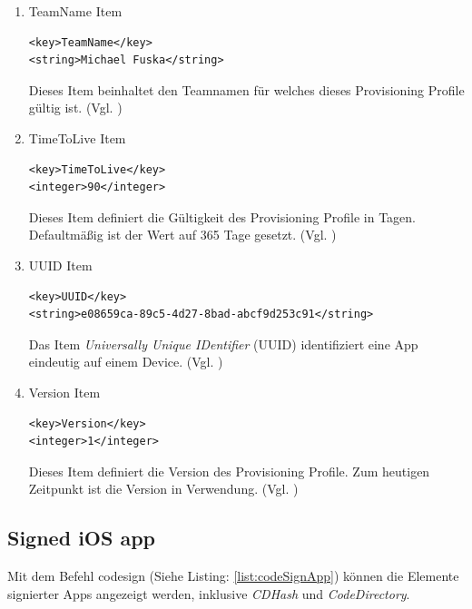 \begin{enumerate}
    \item TeamName Item
\begin{lstlisting}[captionpos=b, caption={TeamName Item}]
<key>TeamName</key>
<string>Michael Fuska</string>
\end{lstlisting}
 Dieses Item beinhaltet den Teamnamen für welches dieses Provisioning Profile gültig ist. (Vgl. \cite{iOSSec[5], Hacking[1]})

   \item TimeToLive Item
\begin{lstlisting}[captionpos=b, caption={TimeToLive Item}]
<key>TimeToLive</key>
<integer>90</integer>
\end{lstlisting}
Dieses Item definiert die Gültigkeit des Provisioning Profile in Tagen. Defaultmäßig ist der Wert auf 365 Tage gesetzt. (Vgl. \cite{iOSSec[5], Hacking[1]})
 
    \item UUID Item
\begin{lstlisting}[captionpos=b, caption={UUID Item}]
<key>UUID</key>
<string>e08659ca-89c5-4d27-8bad-abcf9d253c91</string>
\end{lstlisting}
Das Item \textit{\glqq Universally Unique IDentifier\grqq{}} (UUID) identifiziert eine App eindeutig auf einem Device. (Vgl. \cite{iOSSec[5], Hacking[1]})

    \item Version Item
\begin{lstlisting}[captionpos=b, caption={Version Item}]
<key>Version</key>
<integer>1</integer> 
\end{lstlisting}
Dieses Item definiert die Version des Provisioning Profile. Zum heutigen Zeitpunkt ist die Version \textit{\grqq{}} in Verwendung. (Vgl. \cite{iOSSec[5], Hacking[1]})
\end{enumerate}

\subsection{Signed iOS app}
\label{sec:SignediOSApp}
Mit dem Befehl \glqq codesign\grqq{} (Siehe Listing: \ref{list:codeSignApp}) können die Elemente signierter Apps angezeigt werden, inklusive \textit{\glqq CDHash\grqq{}} und \textit{\glqq CodeDirectory\grqq}.
\newline

